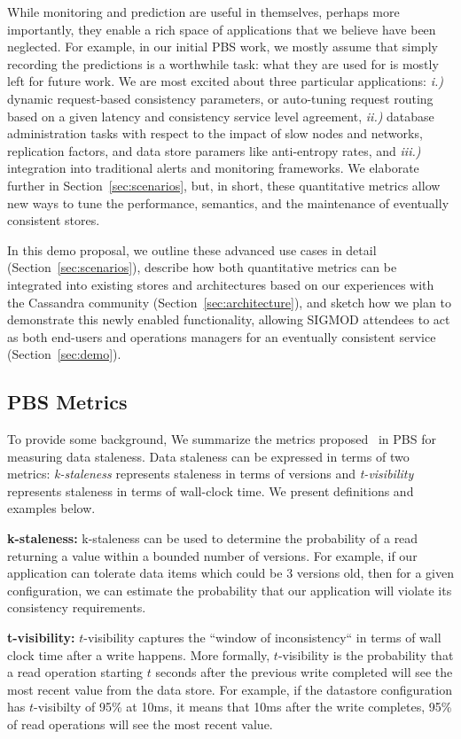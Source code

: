 While monitoring and prediction are useful in themselves, perhaps more
importantly, they enable a rich space of applications that we believe
have been neglected. For example, in our initial PBS work, we mostly
assume that simply recording the predictions is a worthwhile task:
what they are used for is mostly left for future work. We are most
excited about three particular applications: \textit{i.)} dynamic
request-based consistency parameters, or auto-tuning request routing
based on a given latency and consistency service level agreement,
\textit{ii.)} database administration tasks with respect to the impact
of slow nodes and networks, replication factors, and data store
paramers like anti-entropy rates, and \textit{iii.)} integration into
traditional alerts and monitoring frameworks. We elaborate further in
Section~\ref{sec:scenarios}, but, in short, these quantitative metrics
allow new ways to tune the performance, semantics, and the maintenance
of eventually consistent stores.

In this demo proposal, we outline these advanced use cases in detail
(Section~\ref{sec:scenarios}), describe how both quantitative metrics
can be integrated into existing stores and architectures based on our
experiences with the Cassandra community
(Section~\ref{sec:architecture}), and sketch how we plan to
demonstrate this newly enabled functionality, allowing SIGMOD
attendees to act as both end-users and operations managers for an
eventually consistent service (Section~\ref{sec:demo}).

\subsection{PBS Metrics}
To provide some background, We summarize the metrics
proposed~\cite{pbs-vldb2012} in PBS for measuring data staleness.  Data
staleness can be expressed in terms of two metrics: \textit{k-staleness}
represents staleness in terms of versions and \textit{t-visibility} represents
staleness in terms of wall-clock time. We present definitions and examples
below.

\textbf{k-staleness:} k-staleness can be used to determine the probability of
a read returning a value within a bounded number of versions. For example, if
our application can tolerate data items which could be $3$ versions old, then
for a given configuration, we can estimate the probability that our application
will violate its consistency requirements. 


\textbf{t-visibility:} $t$-visibility captures the ``window of inconsistency``
in terms of wall clock time after a write happens. More formally, $t$-visibility
is the probability that a read operation starting $t$ seconds after the previous
write completed will see the most recent value from the data store. For example,
if the datastore configuration has $t$-visibilty of 95\% at 10ms, it means that
10ms after the write completes, 95\% of read operations will see the most recent
value.
